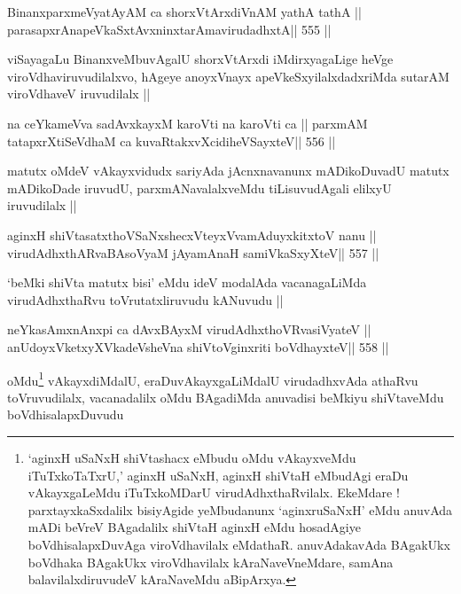 
\begin{shl}
BinanxparxmeVyatAyAM ca shorxVtArxdiVnAM yathA tathA ||
parasapxrAnapeVkaSxtAvxninxtarAmavirudadhxtA\hfill || 555 ||
\end{shl}

\begin{artha}
viSayagaLu BinanxveMbuvAgalU shorxVtArxdi iMdirxyagaLige heVge
viroVdhaviruvudilalxvo, hAgeye anoyxVnayx apeVkeSxyilalxdadxriMda
sutarAM viroVdhaveV iruvudilalx ||
\end{artha}

\begin{shl}
na ceYkameVva sadAvxkayxM karoVti na karoVti ca ||
parxmAM tatapxrXtiSeVdhaM ca kuvaRtakxvXcidiheVSayxteV\hfill || 556 ||
\end{shl}

\begin{artha}
matutx oMdeV vAkayxvidudx sariyAda jAcnxnavanunx mADikoDuvadU matutx
mADikoDade iruvudU, parxmANavalalxveMdu tiLisuvudAgali elilxyU
iruvudilalx ||
\end{artha}



\begin{shl}
aginxH shiVtasatxthoVSaNxshecxVteyxVvamAduyxkitxtoV nanu ||
virudAdhxthARvaBAsoV\s yaM jAyamAnaH samiVkaSxyXteV\hfill || 557 ||
\end{shl}

\begin{artha}
`beMki shiVta matutx bisi' eMdu ideV modalAda vacanagaLiMda
  virudAdhxthaRvu toVrutatxliruvudu kANuvudu ||

\end{artha}

\begin{shl}
neYkasAmxnAnxpi ca dAvxBAyxM virudAdhxthoVR\s vasiVyateV ||
anUdoyxVketxyXVkadeVsheVna shiVtoV\s ginxriti boVdhayxteV\hfill || 558 ||
\end{shl}



\begin{artha}
oMdu\footnote{`aginxH uSaNxH shiVtashacx eMbudu oMdu
  vAkayxveMdu iTuTxkoTaTxrU,' aginxH uSaNxH, aginxH shiVtaH eMbudAgi
  eraDu vAkayxgaLeMdu iTuTxkoMDarU virudAdhxthaRvilalx. EkeMdare !
  parxtayxkaSxdalilx bisiyAgide yeMbudanunx `aginxruSaNxH' eMdu
  anuvAda mADi beVreV BAgadalilx shiVtaH aginxH eMdu hosadAgiye
  boVdhisalapxDuvAga viroVdhavilalx eMdathaR. anuvAdakavAda BAgakUkx
  boVdhaka BAgakUkx viroVdhavilalx kAraNaveVneMdare,
  samAna balavilalxdiruvudeV kAraNaveMdu aBipArxya.} vAkayxdiMdalU, 
  eraDu\footnotemark[\thefootnote]
  vAkayxgaLiMdalU
virudadhxvAda athaRvu toVruvudilalx, vacanadalilx oMdu BAgadiMda
anuvadisi beMkiyu shiVtaveMdu boVdhisalapxDuvudu
\end{artha}

